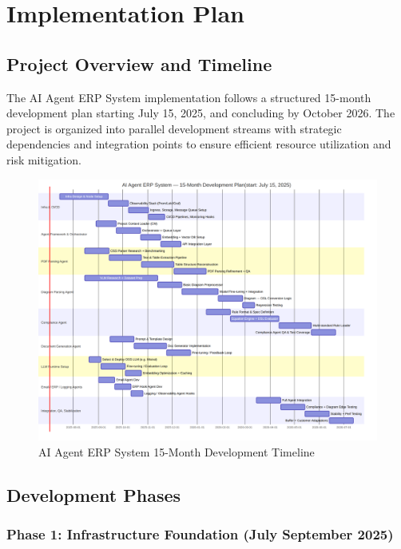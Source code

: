 \documentclass[12pt]{report}
\begin{document}
\chapter{Implementation Plan}
\section{Project Overview and Timeline}
The AI Agent ERP System implementation follows a structured 15-month development plan starting July 15, 2025, and concluding by October 2026. The project is organized into parallel development streams with strategic dependencies and integration points to ensure efficient resource utilization and risk mitigation.

\begin{figure}[htbp]
\centering
\includegraphics[width=\textwidth,height=0.8\textheight,keepaspectratio]{../../pics/gantt.png}
\caption{AI Agent ERP System 15-Month Development Timeline}
\label{fig:implementation-timeline}
\end{figure}

\section{Development Phases}

\subsection{Phase 1: Infrastructure Foundation (July September 2025)}
\end{document}
